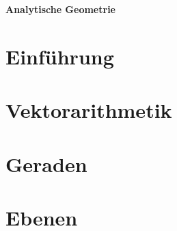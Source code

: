 \documentclass[a4paper,12pt]{article}
\newcommand{\Uebungsblatt}{Analytische Geometrie}
\begin{document}
	\thispagestyle{fancy}
	\begin{center}
		\LARGE \sf \textbf{ \Uebungsblatt{}}
	\end{center}

	\vspace*{0.1cm}
	\section{Einführung}
	\section{Vektorarithmetik}
	\section{Geraden}
	\section{Ebenen}
	
\end{document}

